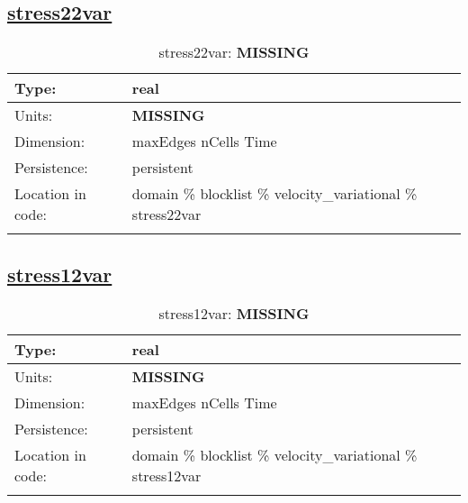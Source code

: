 \subsection[stress22var]{\hyperref[sec:var_tab_velocity_variational]{stress22var}}
\label{subsec:var_sec_velocity_variational_stress22var}
\begin{center}
\begin{longtable}{| p{2.0in} | p{4.0in} |}
        \hline 
        Type: & real \\
        \hline 
        Units: & {\bf \color{red} MISSING} \\
        \hline 
        Dimension: & maxEdges nCells Time \\
        \hline 
        Persistence: & persistent \\
        \hline 
         Location in code: & domain \% blocklist \% velocity\_variational \% stress22var \\
         \hline 
    \caption{stress22var: {\bf \color{red} MISSING}}
\end{longtable}
\end{center}
\subsection[stress12var]{\hyperref[sec:var_tab_velocity_variational]{stress12var}}
\label{subsec:var_sec_velocity_variational_stress12var}
\begin{center}
\begin{longtable}{| p{2.0in} | p{4.0in} |}
        \hline 
        Type: & real \\
        \hline 
        Units: & {\bf \color{red} MISSING} \\
        \hline 
        Dimension: & maxEdges nCells Time \\
        \hline 
        Persistence: & persistent \\
        \hline 
         Location in code: & domain \% blocklist \% velocity\_variational \% stress12var \\
         \hline 
    \caption{stress12var: {\bf \color{red} MISSING}}
\end{longtable}
\end{center}
